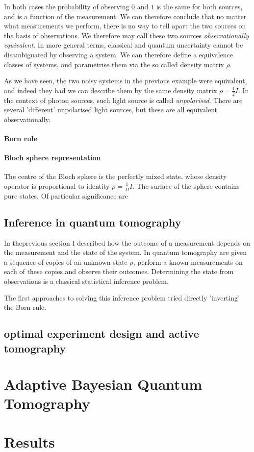 In both cases the probability of observing $0$ and $1$ is the same for both sources, and is a function of the measurement. We can therefore conclude that no matter what measurements we perform, there is no way to tell apart the two sources on the basis of observations. We therefore may call these two sources \emph{observationally equivalent}.  In more general terms, classical and quantum uncertainty cannot be disambiguated by observing a system. We can therefore define a equivalence classes of systems, and parametrise them via the so called density matrix $\rho$.

As we have seen, the two noisy systems in the previous example were equivalent, and indeed they had we can describe them by the same density matrix $\rho=\frac{1}{2}I$. In the context of photon sources, such light source is called \emph{unpolarised}. There are several 'different' unpolarised light sources, but these are all equivalent observationally.



\paragraph{Born rule}

\paragraph{Bloch sphere representation} The centre of the Bloch sphere is the perfectly mixed state, whose density operator is proportional to identity $\rho=\frac{1}{D}I$. The surface of the sphere contains pure states. Of particular significance are 

\subsection{Inference in quantum tomography}

In theprevious section I described how the outcome of a measurement depends on the measurement and the state of the system. In quantum tomography are given a sequence of copies of an unknown state $\rho$, perform a known measurements on each of these copies and observe their outcomes. Determining the state from observations is a classical statistical inference problem.

The first approaches to solving this inference problem tried directly 'inverting' the Born rule.	

\subsection{optimal experiment design and active tomography}

\section{Adaptive Bayesian Quantum Tomography}

\section{Results}

